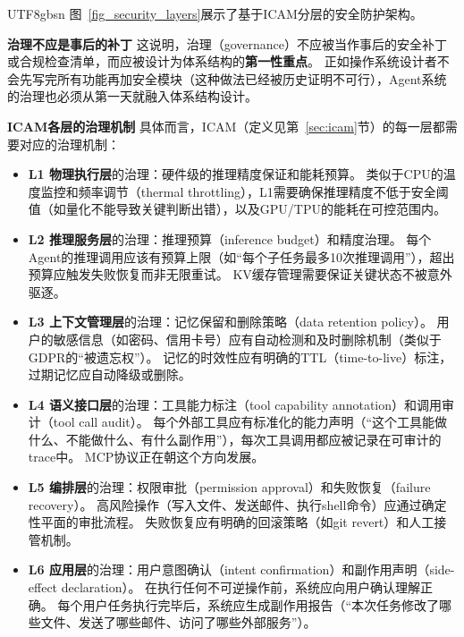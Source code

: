 \documentclass[11pt,a4paper]{article}
\begin{document}
\begin{CJK*}{UTF8}{gbsn}
图~\ref{fig_security_layers}展示了基于ICAM分层的安全防护架构。


\textbf{治理不应是事后的补丁}
这说明，治理（governance）不应被当作事后的安全补丁或合规检查清单，而应被设计为体系结构的\textbf{第一性重点}。
正如操作系统设计者不会先写完所有功能再加安全模块（这种做法已经被历史证明不可行\cite{ostep_2023}），Agent系统的治理也必须从第一天就融入体系结构设计。

\textbf{ICAM各层的治理机制}
具体而言，ICAM（定义见第~\ref{sec:icam}节）的每一层都需要对应的治理机制：

\begin{itemize}[nosep]
\item \textbf{L1 物理执行层}的治理：硬件级的推理精度保证和能耗预算。
类似于CPU的温度监控和频率调节（thermal throttling），L1需要确保推理精度不低于安全阈值（如量化不能导致关键判断出错），以及GPU/TPU的能耗在可控范围内。

\item \textbf{L2 推理服务层}的治理：推理预算（inference budget）和精度治理。
每个Agent的推理调用应该有预算上限（如``每个子任务最多10次推理调用''），超出预算应触发失败恢复而非无限重试。
KV缓存管理需要保证关键状态不被意外驱逐。

\item \textbf{L3 上下文管理层}的治理：记忆保留和删除策略（data retention policy）。
用户的敏感信息（如密码、信用卡号）应有自动检测和及时删除机制（类似于GDPR的``被遗忘权''）。
记忆的时效性应有明确的TTL（time-to-live）标注，过期记忆应自动降级或删除。

\item \textbf{L4 语义接口层}的治理：工具能力标注（tool capability annotation）和调用审计（tool call audit）。
每个外部工具应有标准化的能力声明（``这个工具能做什么、不能做什么、有什么副作用''），每次工具调用都应被记录在可审计的trace中。
MCP协议\cite{mcp_intro_2026}正在朝这个方向发展。

\item \textbf{L5 编排层}的治理：权限审批（permission approval）和失败恢复（failure recovery）。
高风险操作（写入文件、发送邮件、执行shell命令）应通过确定性平面的审批流程。
失败恢复应有明确的回滚策略（如git revert）和人工接管机制。

\item \textbf{L6 应用层}的治理：用户意图确认（intent confirmation）和副作用声明（side-effect declaration）。
在执行任何不可逆操作前，系统应向用户确认理解正确。
每个用户任务执行完毕后，系统应生成副作用报告（``本次任务修改了哪些文件、发送了哪些邮件、访问了哪些外部服务''）。
\end{itemize}


\end{CJK*}
\end{document}
